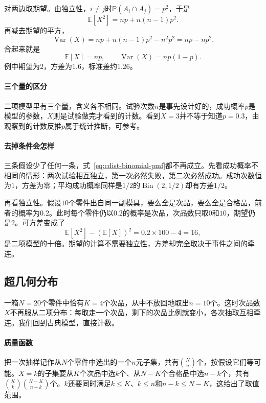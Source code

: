 对两边取期望。由独立性，$i\neq j$时$\mathbb{P}(A_i\cap A_j)=p^{2}$，于是
\[
  \mathbb{E}[X^{2}]=np+n(n-1)p^{2}.
\]
再减去期望的平方，
\[
  \operatorname{Var}(X)=np+n(n-1)p^{2}-n^{2}p^{2}=np-np^{2}.
\]
合起来就是
\begin{equation}
  \mathbb{E}[X]=np,\qquad \operatorname{Var}(X)=np(1-p).
  \label{eq:cdist-binomial-moments}
\end{equation}
例中期望为$2$，方差为$1.6$，标准差约$1.26$。

\paragraph{三个量的区分}
二项模型里有三个量，含义各不相同。试验次数$n$是事先设计好的，成功概率$p$是模型的参数，$X$则是试验做完才看到的计数。看到$X=3$并不等于知道$p=0.3$，由观察到的计数反推$p$属于统计推断，可参考。

\paragraph{去掉条件会怎样}
三条假设少了任何一条，式~\eqref{eq:cdist-binomial-pmf}都不再成立。先看成功概率不相同的情形：两次试验相互独立，第一次必然失败，第二次必然成功。成功次数恒为$1$，方差为零；平均成功概率同样是$1/2$的$\operatorname{Bin}(2,1/2)$却有方差$1/2$。

再看独立性。假设$10$个零件出自同一副模具，要么全是次品，要么全是合格品，前者的概率为$0.2$。此时每个零件仍以$0.2$的概率是次品，次品数只取$0$和$10$，期望仍是$2$。可方差变成了
\[
  \mathbb{E}[X^{2}]-(\mathbb{E}[X])^{2}=0.2\times100-4=16,
\]
是二项模型的十倍。期望的计算不需要独立性，方差却完全取决于事件之间的牵连。

\subsection{超几何分布}
\label{sec:cdist-hypergeometric}

一箱$N=20$个零件中恰有$K=4$个次品，从中不放回地取出$n=10$个。这时次品数$X$不再服从二项分布：每取走一个次品，剩下的次品比例就变小，各次抽取互相牵连。我们回到古典模型，直接计数。

\paragraph{质量函数}
把一次抽样记作从$N$个零件中选出的一个$n$元子集，共有$\binom{N}{n}$个，按假设它们等可能。$X=k$的子集要从$K$个次品中选$k$个、从$N-K$个合格品中选$n-k$个，共有$\binom{K}{k}\binom{N-K}{n-k}$个。$k$还要同时满足$k\leq K$、$k\leq n$和$n-k\leq N-K$，这给出了取值范围。

